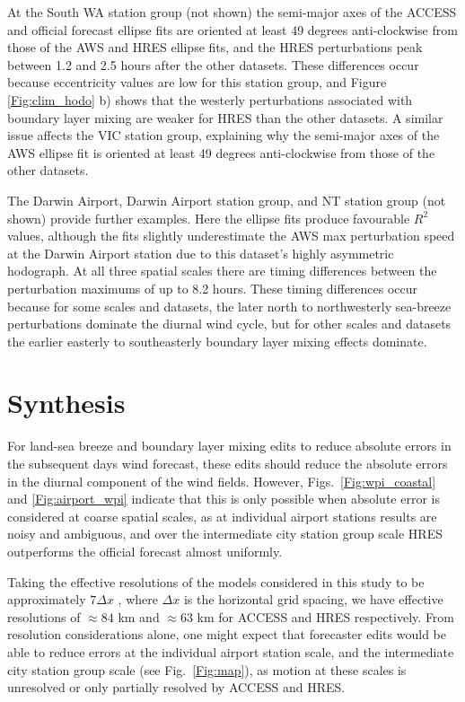\documentclass[twocol]{ametsoc}
\begin{document}
At the South WA station group (not shown) the semi-major axes of the ACCESS and official forecast ellipse fits are oriented at least 49 degrees anti-clockwise from those of the AWS and HRES ellipse fits, and the HRES perturbations peak between 1.2 and 2.5 hours after the other datasets. These differences occur because eccentricity values are low for this station group, and Figure \ref{Fig:clim_hodo} b) shows that the westerly perturbations associated with boundary layer mixing are weaker for HRES than the other datasets. A similar issue affects the VIC station group, explaining why the semi-major axes of the AWS ellipse fit is oriented at least 49 degrees anti-clockwise from those of the other datasets. 

The Darwin Airport, Darwin Airport station group, and NT station group (not shown) provide further examples. Here the ellipse fits produce favourable $R^2$ values, although the fits slightly underestimate the AWS max perturbation speed at the Darwin Airport station due to this dataset's highly asymmetric hodograph. At all three spatial scales there are timing differences between the perturbation maximums of up to 8.2 hours. These timing differences occur because for some scales and datasets, the later north to northwesterly sea-breeze perturbations dominate the diurnal wind cycle, but for other scales and datasets the earlier easterly to southeasterly boundary layer mixing effects dominate.

\section{Synthesis}
\label{Sec:Discussion}
For land-sea breeze and boundary layer mixing edits to reduce absolute errors in the subsequent days wind forecast, these edits should reduce the absolute errors in the diurnal component of the wind fields. However, Figs.~\ref{Fig:wpi_coastal} and \ref{Fig:airport_wpi} indicate that this is only possible when absolute error is considered at coarse spatial scales, as at individual airport stations results are noisy and ambiguous, and over the intermediate city station group scale HRES outperforms the official forecast almost uniformly.  

Taking the effective resolutions of the models considered in this study to be approximately $7\Delta x$ \citep[e.g.][]{skamarock04, abdalla13}, where $\Delta x$ is the horizontal grid spacing, we have effective resolutions of $\approx 84$ km and $\approx 63$ km for ACCESS and HRES respectively. From resolution considerations alone, one might expect that forecaster edits would be able to reduce errors at the individual airport station scale, and the intermediate city station group scale (see Fig.~\ref{Fig:map}), as motion at these scales is unresolved or only partially resolved by ACCESS and HRES. 
\end{document}
